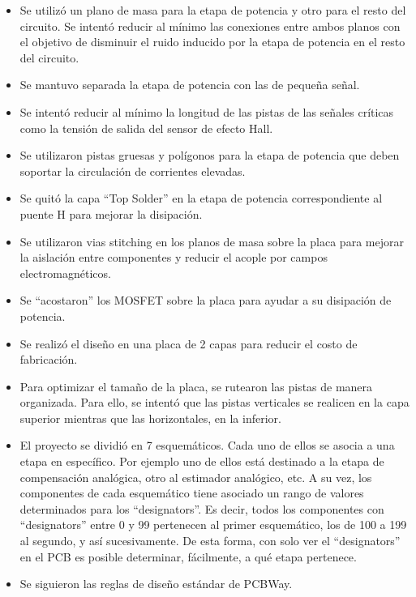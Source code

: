 \begin{itemize}
	\item Se utilizó un plano de masa para la etapa de potencia y otro para el resto del circuito. Se intentó reducir al mínimo las conexiones entre ambos planos con el objetivo de disminuir el ruido inducido por la etapa de potencia en el resto del circuito.
	\item Se mantuvo separada la etapa de potencia con las de pequeña señal.
	\item Se intentó reducir al mínimo la longitud de las pistas de las señales críticas como la tensión de salida del sensor de efecto Hall.
	\item Se utilizaron pistas gruesas y polígonos para la etapa de potencia que deben soportar la circulación de corrientes elevadas.
	\item Se quitó la capa ``Top Solder'' en la etapa de potencia correspondiente al puente H para mejorar la disipación.
	\item Se utilizaron vias stitching en los planos de masa sobre la placa para mejorar la aislación entre componentes y reducir el acople por campos electromagnéticos.
	\item Se ``acostaron'' los MOSFET sobre la placa para ayudar a su disipación de potencia.
	\item Se realizó el diseño en una placa de 2 capas para reducir el costo de fabricación.
	\item Para optimizar el tamaño de la placa, se rutearon las pistas de manera organizada. Para ello, se intentó que las pistas verticales se realicen en la capa superior mientras que las horizontales, en la inferior.
	\item El proyecto se dividió en 7 esquemáticos. Cada uno de ellos se asocia a una etapa en específico. Por ejemplo uno de ellos está destinado a la etapa de compensación analógica, otro al estimador analógico, etc. A su vez, los componentes de cada esquemático tiene asociado un rango de valores determinados para los ``designators''. Es decir, todos los componentes con ``designators'' entre 0 y 99 pertenecen al primer esquemático, los de 100 a 199 al segundo, y así sucesivamente.  De esta forma, con solo ver el ``designators'' en el PCB es posible determinar, fácilmente, a qué etapa pertenece.  
	\item Se siguieron las reglas de diseño estándar de PCBWay.
	
\end{itemize}



